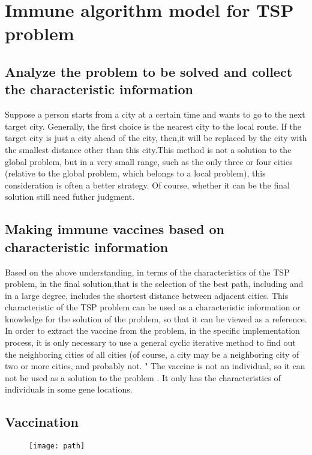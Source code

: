 \documentclass{article}
\begin{document}
\section{
Immune algorithm model for TSP problem}
\subsection{Analyze the problem to be solved and collect the characteristic information}


 Suppose a person starts from a city at a certain time and wants to go to the next target city. Generally, the first choice is the nearest city to the local route. If the target city is just a city ahead of the city, then,it will be replaced by the city with the smallest distance other than this city.This method is not a solution to the global problem, but in a very small range, such as the only three or four cities (relative to the global problem, which belongs to a local problem), this consideration is often a better strategy. Of course, whether it can be the final solution still
need futher judgment.
\subsection{Making immune vaccines based on characteristic information}
Based on the above understanding, in terms of the characteristics of the TSP problem, in the final solution,that is the selection of the best path, including and in a large degree, includes the shortest distance between adjacent cities. This characteristic of the TSP problem can be used as a characteristic information or knowledge for the solution of the problem, so that it can be viewed as a reference. In order to extract the vaccine from the problem, in the specific implementation process, it is only necessary to use a general cyclic iterative method to find out the neighboring cities of all cities (of course, a city may be a neighboring city of two or more cities, and probably not. "
The vaccine is not an individual, so it can not be used as a solution to the problem . It only has the characteristics of individuals in some gene locations.
\subsection{Vaccination}
\begin{figure}[h!]
\centering
\texttt{[image: path]}
\end{figure}
\end{document}
